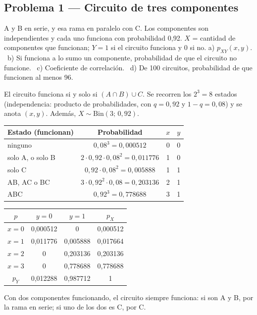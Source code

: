 \subsection{Problema 1 --- Circuito de tres componentes}
\begin{enun}
A y B en serie, y esa rama en paralelo con C. Los componentes son independientes y cada uno funciona con probabilidad 0,92. $X$ = cantidad de componentes que funcionan; $Y=1$ si el circuito funciona y $0$ si no.
a) $p_{XY}(x,y)$. \ b) Si funciona a lo sumo un componente, probabilidad de que el circuito no funcione. \ c) Coeficiente de correlación. \ d) De 100 circuitos, probabilidad de que funcionen al menos 96.
\end{enun}
\begin{metodo}
El circuito funciona si y solo si $(A\cap B)\cup C$. Se recorren los $2^3=8$ estados (independencia: producto de probabilidades, con $q=0{,}92$ y $1-q=0{,}08$) y se anota $(x,y)$. Además, $X\sim\mathrm{Bin}(3;\,0{,}92)$.
\end{metodo}
\begin{center}
\renewcommand{\arraystretch}{1.25}
\begin{tabular}{@{}lccc@{}}
\toprule
Estado (funcionan) & Probabilidad & $x$ & $y$\\\midrule
ninguno & $0{,}08^3=0{,}000512$ & 0 & 0\\
solo A, o solo B & $2\cdot0{,}92\cdot0{,}08^2=0{,}011776$ & 1 & 0\\
solo C & $0{,}92\cdot0{,}08^2=0{,}005888$ & 1 & 1\\
AB, AC o BC & $3\cdot0{,}92^2\cdot0{,}08=0{,}203136$ & 2 & 1\\
ABC & $0{,}92^3=0{,}778688$ & 3 & 1\\\bottomrule
\end{tabular}
\qquad
\begin{tabular}{@{}c|cc|c@{}}
\toprule
$p$ & $y=0$ & $y=1$ & $p_X$\\\midrule
$x=0$ & 0,000512 & 0 & 0,000512\\
$x=1$ & 0,011776 & 0,005888 & 0,017664\\
$x=2$ & 0 & 0,203136 & 0,203136\\
$x=3$ & 0 & 0,778688 & 0,778688\\\midrule
$p_Y$ & 0,012288 & 0,987712 & 1\\\bottomrule
\end{tabular}
\end{center}
Con dos componentes funcionando, el circuito siempre funciona: si son A y B, por la rama en serie; si uno de los dos es C, por C.

